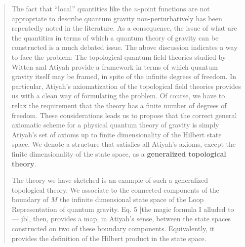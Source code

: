 \documentclass{article}
\begin{document}
\begin{quote}
The fact that ``local'' quantities like the \(n\)-point functions are
not appropriate to describe quantum gravity non-perturbatively has been
repeatedly noted in the literature. As a consequence, the issue of what
are the quantities in terms of which a quantum theory of gravity can be
constructed is a much debated issue. The above discussion indicates a
way to face the problem: The topological quantum field theories studied
by Witten and Atiyah provide a framework in terms of which quantum
gravity itself may be framed, in spite of the infinite degrees of
freedom. In particular, Atiyah's axiomatization of the topological field
theories provides us with a clean way of formulating the problem. Of
course, we have to relax the requirement that the theory has a finite
number of degrees of freedom. These considerations leads us to propose
that the correct general axiomatic scheme for a physical quantum theory
of gravity is simply Atiyah's set of axioms up to finite dimensionality
of the Hilbert state space. We denote a structure that satisfies all
Atiyah's axioms, except the finite dimensionality of the state space, as
a \textbf{generalized topological theory}.

The theory we have sketched is an example of such a generalized
topological theory. We associate to the connected components of the
boundary of \(M\) the infinite dimensional state space of the Loop
Representation of quantum gravity. Eq. 5 {[}the magic formula I alluded
to --- jb{]}, then, provides a map, in Atiyah's sense, between the state
spaces constructed on two of these boundary components. Equivalently, it
provides the definition of the Hilbert product in the state space.


\end{quote}
\end{document}
